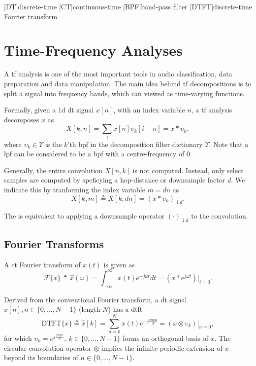 [DT]{discrete-time}
[CT]{continuous-time}
[BPF]{band-pass filter}
[DTFT]{discrete-time Fourier transform}

\chapter{Time-Frequency Analyses}
\label{chap:p1i}

A \ac{tf} analysis is one of the most important tools in audio classification, data preparation and data manipulation. The main idea behind \ac{tf} decompositions is to split a signal into frequency bands, which can viewed as time-varying functions.

Formally, given a \ac{1d} \ac{dt} signal $x[n]$, with an index variable $n$, a \ac{tf} analysis decomposes $x$ as 
\begin{equation}
    X[k, n] = \sum_i x[n] \upsilon_k[i - n] = x * \upsilon_k,
\end{equation}
where $\upsilon_k \in \Upsilon$ is the $k$'th \ac{bpf} in the decomposition filter dictionary $\Upsilon$. Note that a \ac{lpf} can be considered to be a \ac{bpf} with a centre-frequency of 0.

Generally, the entire convolution $X[n,k]$ is not computed. Instead, only select samples are computed by speficying a hop-distance or downsample factor $d$. We indicate this by tranforming the index variable $m = dn$ as 
\begin{equation}
    \label{eqn:gentf}
    X[k, m] \triangleq X[k, dn] = \left(x * \upsilon_k\right)_{\downarrow d}.
\end{equation}

The is equivalent to applying a downsample operator $\left(\cdot\right)_{\downarrow d}$ to the convolution. 

\section{Fourier Transforms}

A \ac{ct} Fourier transform of $x(t)$ is given as 
\begin{equation}
    \mathcal{F} \{x\} \triangleq \hat{x}(\omega) = \int_{-\infty}^{\infty} x(t) e^{-j\omega t} dt = \left(x * e^{j\omega t}\right)\bigg|_{t=0}.
\end{equation}


Derived from the conventional Fourier transform, a \ac{dt} signal $x[n], n \in \{0, ..., N-1\}$ (length $N$) has a \ac{dtft}
\begin{equation}
    \label{eqn:dtft}
    \text{DTFT}\{x\} \triangleq \hat{x}[k] = \sum_{n=0}^{N} x(t) e^{-j \frac{2\pi k n}{N}} = \left(x \otimes \upsilon_k\right)\bigg|_{n=0},
\end{equation}
for which $\upsilon_k = e^{j \frac{2\pi k n}{N}}, \ k \in \{0, ..., N-1\}$ forms an orthogonal basis of $x$. The circular convolution operator $\otimes$ implies the infinite periodic extension of $x$ beyond its boundaries of $n \in \{0, ..., N-1\}$. 

